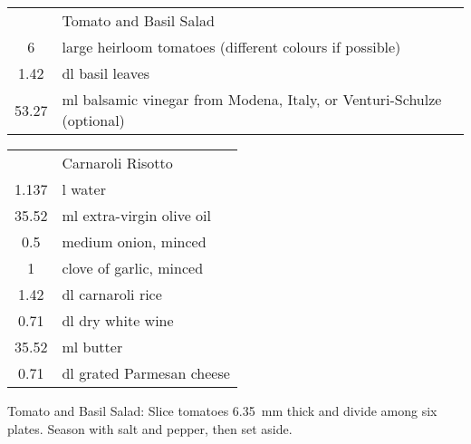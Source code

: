 \documentclass[a4paper]{article}
\newenvironment{instructions}[1]{\noindent\textsf{\textcolor{emphasis}{#1:}}}{\vspace{1ex}}
\begin{document}
\begin{minipage}[t][0.9\textheight]{0.8\textwidth}
                \vspace{1cm}
                \begin{minipage}[t]{0.5\textwidth}
                        \vspace{0pt}\raggedright
                        \begin{tabular}{Sp{5cm}}
        & \textsf{\textcolor{emphasis}{Tomato and Basil Salad}} \\
                                6 & large heirloom tomatoes (different colours if possible) \\
                                1.42 & \si{dl} basil leaves \\ %
                                53.27 & \si{ml} balsamic vinegar from Modena, Italy, or Venturi-Schulze (optional) \\
                        \end{tabular}
                \end{minipage}\hfill
                \begin{minipage}[t]{0.5\textwidth}
                        \vspace{0pt}\raggedleft
                        \begin{tabular}{Sp{5cm}}
        & \textsf{\textcolor{emphasis}{Carnaroli Risotto}} \\
                                1.137 & \si{l} water \\
                                35.52 & \si{ml} extra-virgin olive oil \\
                                0.5 & medium onion, minced \\
                                1 & clove of garlic, minced \\
                                1.42 & \si{dl} carnaroli rice \\
                                0.71 & \si{dl} dry white wine \\
                                35.52 & \si{ml} butter \\
                                0.71 & \si{dl} grated Parmesan cheese \\
                        \end{tabular}
                \end{minipage}
                \vspace{1cm}

                \begin{instructions}{Tomato and Basil Salad}
                        Slice tomatoes \SI{6.35}{mm} thick and divide among six plates. Season
                        with salt and pepper, then set aside. 
                \end{instructions}


\end{minipage}
\end{document}
